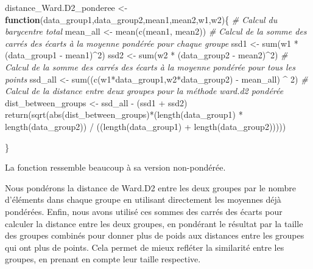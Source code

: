 \documentclass[
]{article}
\newenvironment{Shaded}{\begin{snugshade}}{\end{snugshade}}
\newcommand{\CommentTok}[1]{\textcolor[rgb]{0.56,0.35,0.01}{\textit{#1}}}
\newcommand{\ControlFlowTok}[1]{\textcolor[rgb]{0.13,0.29,0.53}{\textbf{#1}}}
\newcommand{\DecValTok}[1]{\textcolor[rgb]{0.00,0.00,0.81}{#1}}
\newcommand{\FunctionTok}[1]{\textcolor[rgb]{0.00,0.00,0.00}{#1}}
\newcommand{\NormalTok}[1]{#1}
\newcommand{\OtherTok}[1]{\textcolor[rgb]{0.56,0.35,0.01}{#1}}
\newcommand{\SpecialCharTok}[1]{\textcolor[rgb]{0.00,0.00,0.00}{#1}}
\begin{document}
\begin{Shaded}
\begin{Highlighting}[]
\NormalTok{distance\_Ward.D2\_ponderee }\OtherTok{\textless{}{-}} \ControlFlowTok{function}\NormalTok{(data\_group1,data\_group2,mean1,mean2,w1,w2)\{}
  \CommentTok{\# Calcul du barycentre total}
\NormalTok{  mean\_all }\OtherTok{\textless{}{-}} \FunctionTok{mean}\NormalTok{(}\FunctionTok{c}\NormalTok{(mean1, mean2))}
  \CommentTok{\# Calcul de la somme des carrés des écarts à la moyenne pondérée pour chaque groupe}
\NormalTok{  ssd1 }\OtherTok{\textless{}{-}} \FunctionTok{sum}\NormalTok{(w1 }\SpecialCharTok{*}\NormalTok{ (data\_group1 }\SpecialCharTok{{-}}\NormalTok{ mean1)}\SpecialCharTok{\^{}}\DecValTok{2}\NormalTok{)}
\NormalTok{  ssd2 }\OtherTok{\textless{}{-}} \FunctionTok{sum}\NormalTok{(w2 }\SpecialCharTok{*}\NormalTok{ (data\_group2 }\SpecialCharTok{{-}}\NormalTok{ mean2)}\SpecialCharTok{\^{}}\DecValTok{2}\NormalTok{)}
  \CommentTok{\# Calcul de la somme des carrés des écarts à la moyenne pondérée pour tous les points}
\NormalTok{  ssd\_all }\OtherTok{\textless{}{-}} \FunctionTok{sum}\NormalTok{((}\FunctionTok{c}\NormalTok{(w1}\SpecialCharTok{*}\NormalTok{data\_group1,w2}\SpecialCharTok{*}\NormalTok{data\_group2) }\SpecialCharTok{{-}}\NormalTok{ mean\_all) }\SpecialCharTok{\^{}} \DecValTok{2}\NormalTok{)}
  \CommentTok{\# Calcul de la distance entre deux groupes pour la méthode ward.d2 pondérée}
\NormalTok{   dist\_between\_groups }\OtherTok{\textless{}{-}}\NormalTok{ ssd\_all }\SpecialCharTok{{-}}\NormalTok{ (ssd1 }\SpecialCharTok{+}\NormalTok{ ssd2)}
  \FunctionTok{return}\NormalTok{(}\FunctionTok{sqrt}\NormalTok{(}\FunctionTok{abs}\NormalTok{(dist\_between\_groups)}\SpecialCharTok{*}\NormalTok{(}\FunctionTok{length}\NormalTok{(data\_group1) }\SpecialCharTok{*} \FunctionTok{length}\NormalTok{(data\_group2)) }\SpecialCharTok{/}\NormalTok{ ((}\FunctionTok{length}\NormalTok{(data\_group1) }\SpecialCharTok{+} \FunctionTok{length}\NormalTok{(data\_group2)))))}
  
\NormalTok{\}}
\end{Highlighting}
\end{Shaded}

La fonction ressemble beaucoup à sa version non-pondérée.

Nous pondérons la distance de Ward.D2 entre les deux groupes par le
nombre d'éléments dans chaque groupe en utilisant directement les
moyennes déjà pondérées. Enfin, nous avons utilisé ces sommes des carrés
des écarts pour calculer la distance entre les deux groupes, en
pondérant le résultat par la taille des groupes combinés pour donner
plus de poids aux distances entre les groupes qui ont plus de points.
Cela permet de mieux refléter la similarité entre les groupes, en
prenant en compte leur taille respective.
\end{document}
